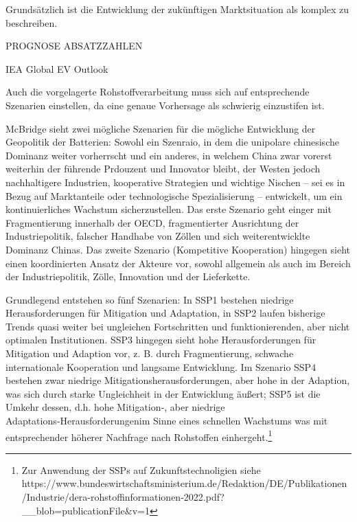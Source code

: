 \documentclass[12pt,a4paper,oneside]{book} %
\begin{document}
Grundsätzlich ist die Entwicklung der zukünftigen Marktsituation als komplex zu beschreiben.

PROGNOSE ABSATZZAHLEN

IEA Global EV Outlook

Auch die vorgelagerte Rohstoffverarbeitung muss sich auf entsprechende Szenarien einstellen, da eine genaue Vorhersage als schwierig einzustifen ist.\autocite{https://www.mckinsey.com/industries/automotive-and-assembly/our-insights/the-battery-chemistries-powering-the-future-of-electric-vehicles}

McBridge sieht zwei mögliche Szenarien für die mögliche Entwicklung der \glqq Geopolitik der Batterien\grqq: Sowohl ein Szenraio, in dem die unipolare chinesische Dominanz weiter vorherrscht und ein anderes, in welchem China zwar vorerst weiterhin der führende Prdouzent und Innovator bleibt, der Westen jedoch nachhaltigere Industrien, kooperative Strategien und wichtige Nischen – sei es in Bezug auf Marktanteile oder technologische Spezialisierung – entwickelt, um ein kontinuierliches Wachstum sicherzustellen.\autocite{McBridge, S. 27}
Das erste Szenario geht einger mit Fragmentierung innerhalb der OECD, fragmentierter Ausrichtung der Industriepolitik, falscher Handhabe von Zöllen und sich weiterentwicklte Dominanz Chinas. Das zweite Szenario (\glqq Kompetitive Kooperation\grqq) hingegen sieht einen koordinierten Ansatz der Akteure vor, sowohl allgemein als auch im Bereich der Industriepolitik, Zölle, Innovation und der Lieferkette. 


Grundlegend entstehen so fünf Szenarien:
In SSP1 bestehen niedrige Herausforderungen für Mitigation und Adaptation, in SSP2 laufen bisherige Trends quasi weiter bei ungleichen Fortschritten und funktionierenden, aber nicht optimalen Institutionen. SSP3 hingegen sieht hohe Herausforderungen für Mitigation und Adaption vor, z. B. durch Fragmentierung, schwache internationale Kooperation und langsame Entwicklung. Im Szenario SSP4 bestehen zwar niedrige Mitigationsherausforderungen, aber hohe in der Adaption, was sich durch starke Ungleichheit in der Entwicklung äußert; SSP5 ist die Umkehr dessen, d.h. hohe Mitigation‑, aber niedrige Adaptations‑Herausforderungenim Sinne eines schnellen Wachstums was mit entsprechender höherer Nachfrage nach Rohstoffen einhergeht.\footnote{Zur Anwendung der SSPs auf Zukunftstechnoligien siehe https://www.bundeswirtschaftsministerium.de/Redaktion/DE/Publikationen/Industrie/dera-rohstoffinformationen-2022.pdf?__blob=publicationFile&v=1}
\end{document}
